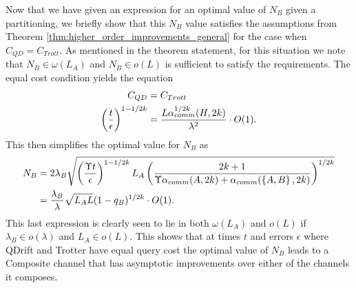 Now that we have given an expression for an optimal value of $N_B$ given a partitioning, we briefly show that this $N_B$ value
satisfies the assumptions from Theorem \ref{thm:higher_order_improvements_general} for the case when $C_{QD} = C_{Trott}$. As mentioned
in the theorem statement, for this situation we note that $N_B \in \omega(L_A)$ and $N_B \in o(L)$ is sufficient to satisfy the requirements.
The equal cost condition yields the equation
\begin{align}
    C_{QD} &= C_{Trott} \\
    \left( \frac{t}{\epsilon} \right)^{1-1/2k} &=  \frac{L \alpha_{comm}^{1/2k}(H, 2k)}{\lambda^2} \cdot O(1).
\end{align}
This then simplifies the optimal value for $N_B$ as
\begin{align}
    N_B &= 2 \lambda_B \sqrt{\left( \frac{\Upsilon t}{\epsilon} \right)^{1-1/2k} L_A \left( \frac{2k+1}{\Upsilon \alpha_{comm}(A, 2k) + \alpha_{comm}(\left\{ A,B \right\}, 2k )} \right)^{1/2k}} \\
    &= \frac{\lambda_B}{\lambda} \sqrt{L_A L} (1 - q_B)^{1/2k} \cdot O(1).
\end{align}
This last expression is clearly seen to lie in both $\omega(L_A)$ and $o(L)$ if $\lambda_B \in o(\lambda)$ and $L_A \in o(L)$. This shows that 
at times $t$ and errors $\epsilon$ where QDrift and Trotter have equal query cost the optimal value of $N_B$ leads to a Composite channel that has
asymptotic improvements over either of the channels it composes. 


